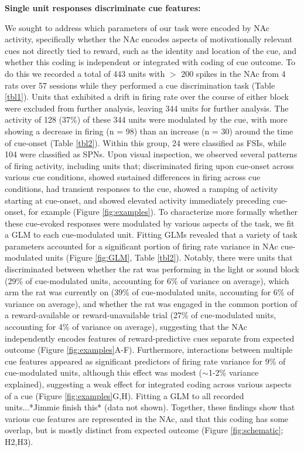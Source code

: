 \documentclass[11pt]{article}
\begin{document}
{\bf Single unit responses discriminate cue features:}

We sought to address which parameters of our task were encoded by NAc activity, specifically whether the NAc encodes aspects of motivationally relevant cues not directly tied to reward, such as the identity and location of the cue, and whether this coding is independent or integrated with coding of cue outcome. To do this we recorded a total of 443 units with $>$ 200 spikes in the NAc from 4 rats over 57 sessions while they performed a cue discrimination task (Table \ref{tbl1}). Units that exhibited a drift in firing rate over the course of either block were excluded from further analysis, leaving 344 units for further analysis. The activity of 128 (37\%) of these 344 units were modulated by the cue, with more showing a decrease in firing (n =  98) than an increase (n = 30) around the time of cue-onset (Table \ref{tbl2}). Within this group, 24 were classified as FSIs, while 104 were classified as SPNs. Upon visual inspection, we observed several patterns of firing activity, including units that; discriminated firing upon cue-onset across various cue conditions, showed sustained differences in firing across cue conditions, had transient responses to the cue, showed a ramping of activity starting at cue-onset, and showed elevated activity immediately preceding cue-onset, for example (Figure \ref{fig:examples}). To characterize more formally whether these cue-evoked responses were modulated by various aspects of the task, we fit a GLM to each cue-modulated unit. Fitting GLMs revealed that a variety of task parameters accounted for a significant portion of firing rate variance in NAc cue-modulated units (Figure \ref{fig:GLM}, Table \ref{tbl2}). Notably, there were units that discriminated between whether the rat was performing in the light or sound block (29\% of cue-modulated units, accounting for 6\% of variance on average), which arm the rat was currently on (39\% of cue-modulated units, accounting for 6\% of variance on average), and whether the rat was engaged in the common portion of a reward-available or reward-unavailable trial (27\% of cue-modulated units, accounting for 4\% of variance on average), suggesting that the NAc independently encodes features of reward-predictive cues separate from expected outcome (Figure \ref{fig:examples}A-F). Furthermore, interactions between multiple cue features appeared as significant predictors of firing rate variance for 9\% of cue-modulated units, although this effect was modest ($\sim$1-2\% variance explained), suggesting a weak effect for integrated coding across various aspects of a cue (Figure \ref{fig:examples}G,H). Fitting a GLM to all recorded units...*Jimmie finish this* (data not shown). Together, these findings show that various cue features are represented in the NAc, and that this coding has some overlap, but is mostly distinct from expected outcome (Figure \ref{fig:schematic}; H2,H3).
\end{document}
